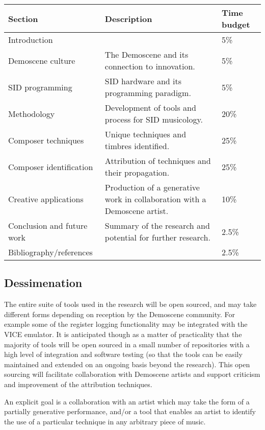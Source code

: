 \documentclass[10pt]{article}
\begin{document}
\begin{multicols*}{2}
  \begin{tabular}{|l|l|l|}
        \hline
        Section & Description & Time budget \\
        \hline
        Introduction &  & 5\% \\
        \hline
        Demoscene culture & The Demoscene and its connection to innovation. & 5\% \\
        \hline
        SID programming & SID hardware and its programming paradigm. & 5\% \\
        \hline
        Methodology & Development of tools and process for SID musicology. & 20\% \\
        \hline
        Composer techniques & Unique techniques and timbres identified. & 25\% \\
        \hline
        Composer identification & Attribution of techniques and their propagation. & 25\% \\
        \hline
        Creative applications & Production of a generative work in collaboration with a Demoscene artist.  & 10\% \\
        \hline
        Conclusion and future work & Summary of the research and potential for further research. & 2.5\% \\
        \hline
        Bibliography/references &  & 2.5\% \\
        \hline
  \end{tabular}

  \subsection{Dessimenation}
  The entire suite of tools used in the research will be open sourced,
  and may take different forms depending on reception by the Demoscene
  community. For example some of the register logging functionality
  may be integrated with the VICE emulator. It is anticipated though
  as a matter of practicality that the majority of tools will be open
  sourced in a small number of repositories with a high level of
  integration and software testing (so that the tools can be easily
  maintained and extended on an ongoing basis beyond the research).
  This open sourcing will facilitate collaboration with Demoscene
  artists and support criticism and improvement of the attribution
  techniques.

  An explicit goal is a collaboration with an artist which may take
  the form of a partially generative performance, and/or a tool that
  enables an artist to identify the use of a particular technique in any
  arbitrary piece of music.


\end{multicols*}
\end{document}
